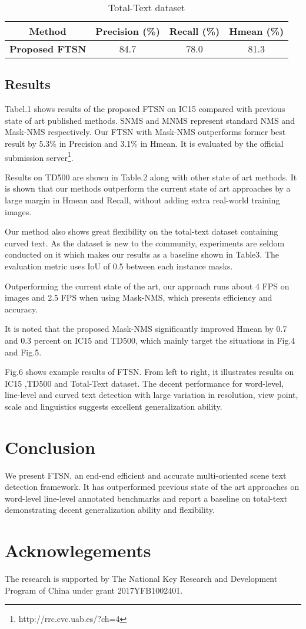 \documentclass[a4paper,conference]{IEEEtran}
\begin{document}
\begin{table}[htbp]
 \caption{\label{tab:3} Total-Text dataset}
 \begin{center}
\begin{tabular}
{c||c|c|c}
Method & Precision (\%) & Recall (\%) & Hmean (\%) \\
\hline\hline
\textbf{Proposed FTSN} & 84.7 & 78.0 & 81.3 \\
\hline
 \end{tabular}
 \end{center}
\end{table}
\subsection{Results}
Tabel.1 shows results of the proposed FTSN on IC15 compared with previous state of art published methods. SNMS and MNMS represent standard NMS and Mask-NMS respectively. Our FTSN with Mask-NMS outperforms former best result by 5.3\% in Precision and 3.1\% in Hmean. It is evaluated by the official submission server\footnote{http://rrc.cvc.uab.es/?ch=4}. 

Results on TD500 are shown in Table.2 along with other state of art methods. It is shown that our methods outperform the current state of art approaches by a large margin in Hmean and Recall, without adding extra real-world training images. 

Our method also shows great flexibility on the total-text dataset containing curved text. As the dataset is new to the community, experiments are seldom conducted on it which makes our results as a baseline shown in Table3. The evaluation metric uses IoU of 0.5 between each instance masks. 

Outperforming the current state of the art, our approach runs about 4 FPS on  images and 2.5 FPS when using Mask-NMS, which presents efficiency and accuracy.

It is noted that the proposed Mask-NMS significantly improved Hmean by 0.7 and 0.3 percent on IC15 and TD500, which mainly target the situations in Fig.4 and Fig.5. 

Fig.6 shows example results of FTSN. From left to right, it illustrates results on IC15 ,TD500 and Total-Text dataset. The decent performance for word-level, line-level and curved text detection with large variation in resolution, view point, scale and linguistics suggests excellent generalization ability.

\section{Conclusion}
We present FTSN, an end-end efficient and accurate multi-oriented scene text detection framework. It has outperformed previous state of the art approaches on word-level line-level annotated benchmarks and report a baseline on total-text demonstrating decent generalization ability and flexibility. 

\section{Acknowlegements}
The research is supported by The National Key Research and Development Program of China under grant 2017YFB1002401.




\end{document}
